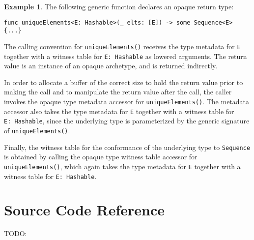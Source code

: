 \documentclass[a4paper,headsepline,bibliography=totoc,toc=flat,fleqn,twoside=semi]{scrbook}
\theoremstyle{definition}
\theoremstyle{definition}
\newtheorem{example}{Example}[chapter]
\theoremstyle{definition}
\begin{document}
\begin{example}
The following generic function declares an opaque return type:
\begin{Verbatim}
func uniqueElements<E: Hashable>(_ elts: [E]) -> some Sequence<E> {...}
\end{Verbatim}
The calling convention for \texttt{uniqueElements()} receives the type metadata for \texttt{E} together with a witness table for \texttt{E:\ Hashable} as lowered arguments. The return value is an instance of an opaque archetype, and is returned indirectly.

In order to allocate a buffer of the correct size to hold the return value prior to making the call and to manipulate the return value after the call, the caller invokes the opaque type metadata accessor for \texttt{uniqueElements()}. The metadata accessor also takes the type metadata for \texttt{E} together with a witness table for \texttt{E:\ Hashable}, since the underlying type is parameterized by the generic signature of \texttt{uniqueElements()}.

Finally, the witness table for the conformance of the underlying type to \texttt{Sequence} is obtained by calling the opaque type witness table accessor for \texttt{uniqueElements()}, which again takes the type metadata for \texttt{E} together with a witness table for \texttt{E:\ Hashable}.
\end{example}

\section{Source Code Reference}

TODO:
\end{document}
